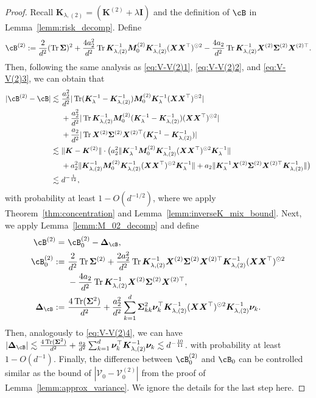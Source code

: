 \documentclass[twoside,11pt]{article}
\def\bI{{\mathbf I}}
\def\bK{{\boldsymbol K}}
\def\bX{{\boldsymbol X}}
\def\bM{{\boldsymbol M}}
\def\bDelta{{\boldsymbol \Delta}}
\def\bSigma{{\boldsymbol \Sigma}}
\def\cV{{\mathcal V}}
\def\cV{{\mathcal V}}
\renewcommand{\bK}{\boldsymbol{K}}
\newcommand{\Tr}{\operatorname{Tr}}
\newcommand{\vnu}{\mbi{\nu}}
\newcommand{\1}{\mathbf{1}}
\def\mbi#1{\boldsymbol{#1}}
\def\mbi#1{\boldsymbol{#1}} %
\begin{document}
\begin{proof}
Recall $\bK_{\lambda,(2)} = (\bK^{(2)}+\lambda\bI) $ and the definition of $\cB$ in Lemma~\ref{lemm:risk_decomp}. Define
\[\cB^{(2)}:=\frac{2}{d^2}(\Tr\bSigma)^2 + \frac{4a_2^2}{d^2}\Tr \bK_{\lambda,(2)}^{-1}\bM_0^{(2)}\bK_{\lambda,(2)}^{-1} (\bX\bX^\top)^{\odot 2}-\frac{4a_2}{d^2}\Tr\bK_{\lambda,(2)}^{-1}\bX^{(2)}\bSigma^{(2)}\bX^{(2)\top}.\]
Then, following the same analysis as \eqref{eq:V-V(2)1}, \eqref{eq:V-V(2)2}, and \eqref{eq:V-V(2)3}, we can obtain that
\begin{align}
       |\cB^{(2)}- \cB|
       \lesssim ~&   \frac{a_2^2}{d^2}|\Tr(\bK_{\lambda}^{-1}-\bK_{\lambda,(2)}^{-1})\bM_0^{(2)}\bK_{\lambda}^{-1}(\bX\bX^\top)^{\odot 2}|\\
       ~&+\frac{a_2^2}{d^2}|\Tr \bK_{\lambda,(2)}^{-1} \bM_0^{(2)}(\bK_{\lambda}^{-1}-\bK_{\lambda,(2)}^{-1})(\bX\bX^\top)^{\odot 2}|\\
       ~&+\frac{ a_2}{d^2}|\Tr\bX^{(2)}\bSigma^{(2)}\bX^{(2)\top}(\bK_{\lambda}^{-1}-\bK_{\lambda,(2)}^{-1})|\\
       \lesssim ~&  \|\bK-\bK^{(2)}\|\cdot\big(a_2^2 \|\bK_{\lambda}^{-1}\bM_0^{(2)}\bK_{\lambda,(2)}^{-1}(\bX\bX^\top)^{\odot 2}\bK_{\lambda}^{-1}\|\\
       &+a_2^2 \|\bK_{\lambda,(2)}^{-1}\bM_0^{(2)}\bK_{\lambda,(2)}^{-1}(\bX\bX^\top)^{\odot 2}\bK_{\lambda}^{-1}\|+a_2 \|\bK_{\lambda }^{-1}\bX^{(2)}\bSigma^{(2)}\bX^{(2)\top}\bK_{\lambda,(2)}^{-1} \|\big)\\
       \lesssim ~& d^{-\frac{1}{12}},
\end{align}with probability at least $1-O(d^{-1/2})$,
where we apply Theorem~\ref{thm:concentration} and Lemma~\ref{lemm:inverseK_mix_bound}. Next, we apply Lemma~\ref{lemm:M_02_decomp} and define
\begin{align}
    \cB^{(2)} =~&\cB_0^{(2)}-\bDelta_{\cB},\\
    \cB_0^{(2)}:=~& \frac{2}{d^2 } \Tr\bSigma^{(2)}  + \frac{ 2a_2^2}{d^2}\Tr \bK_{\lambda,(2)}^{-1}\bX^{(2)}\bSigma^{(2)}\bX^{(2)\top}\bK_{\lambda,(2)}^{-1} (\bX\bX^\top)^{\odot 2}\\
    ~&-\frac{4a_2}{d^2}\Tr\bK_{\lambda,(2)}^{-1}\bX^{(2)}\bSigma^{(2)}\bX^{(2)\top},\\
    \bDelta_{\cB} :=~& \frac{4\Tr(\bSigma^2)}{d^2}+\frac{ a_2^2}{d^2}\sum_{k=1}^d \bSigma_{kk}^2\vnu_k^\top\bK_{\lambda,(2)}^{-1} (\bX\bX^\top)^{\odot 2}\bK_{\lambda,(2)}^{-1} \vnu_k.
\end{align}
Then, analogously to \eqref{eq:V-V(2)4}, we can have
$ |\bDelta_{\cB} |\lesssim \frac{4\Tr(\bSigma^2)}{d^2}+\frac{ a_2 }{d^2}\sum_{k=1}^d \vnu_k^\top\bK_{\lambda,(2)}^{-1}   \vnu_k\lesssim d^{-\frac{10}{11}}$.
with probability at least $1-O(d^{-1})$. Finally, the difference between $\cB_0^{(2)}$ and $\cB_0$ can be controlled similar as the bound of $|\cV_0-\cV_0^{(2)}|$ from the proof of Lemma~\ref{lemm:approx_variance}. We ignore the details for the last step here.
\end{proof}
\end{document}
